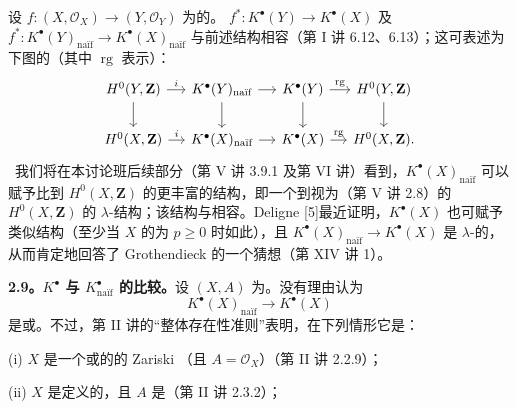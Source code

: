 设 $f:(X,\mathscr O_X)\to(Y,\mathscr O_Y)$ 为的。 $f^*:K^\bullet(Y)\to K^\bullet(X)$ 及 $f^*:K^\bullet(Y)_{\text{naïf}}\to K^\bullet(X)_{\text{naïf}}$ 与前述结构相容（第 I 讲 6.12、6.13）；这可表述为下图的（其中 $\operatorname{rg}$ 表示）：
\[\begin{tikzcd}[column sep=small]
H^0(Y,\mathbf Z)\arrow[r,"i"]\arrow[d]&K^\bullet(Y)_{\text{naïf}}\arrow[r]\arrow[d]&K^\bullet(Y)\arrow[r,"\operatorname{rg}"]\arrow[d]&H^0(Y,\mathbf Z)\arrow[d]\\
H^0(X,\mathbf Z)\arrow[r,"i"]&K^\bullet(X)_{\text{naïf}}\arrow[r]&K^\bullet(X)\arrow[r,"\operatorname{rg}"]&H^0(X,\mathbf Z).
\end{tikzcd}\]
\textasteriskcentered\ 我们将在本讨论班后续部分（第 V 讲 3.9.1 及第 VI 讲）看到，$K^\bullet(X)_{\text{naïf}}$ 可以赋予比到 $H^0(X,\mathbf Z)$ 的更丰富的结构，即一个到视为（第 V 讲 2.8）的 $H^0(X,\mathbf Z)$ 的 $\lambda$-结构；该结构与相容。Deligne [5]最近证明，$K^\bullet(X)$ 也可赋予类似结构（至少当 $X$ 的为 $p\geq0$ 时如此），且 $K^\bullet(X)_{\text{naïf}}\to K^\bullet(X)$ 是 $\lambda$-的，从而肯定地回答了 Grothendieck 的一个猜想（第 XIV 讲 1）。\ \textasteriskcentered

\textbf{2.9。$K^\bullet$ 与 $K^\bullet_{\text{naïf}}$ 的比较。}设 $(X,A)$ 为。没有理由认为
\[K^\bullet(X)_{\text{naïf}}\longrightarrow K^\bullet(X)\]
是或。不过，第 II 讲的“整体存在性准则”表明，在下列情形它是：

(i) $X$ 是一个或的的 Zariski （且 $A=\mathscr O_X$）（第 II 讲 2.2.9）；

(ii) $X$ 是定义的，且 $A$ 是（第 II 讲 2.3.2）；

